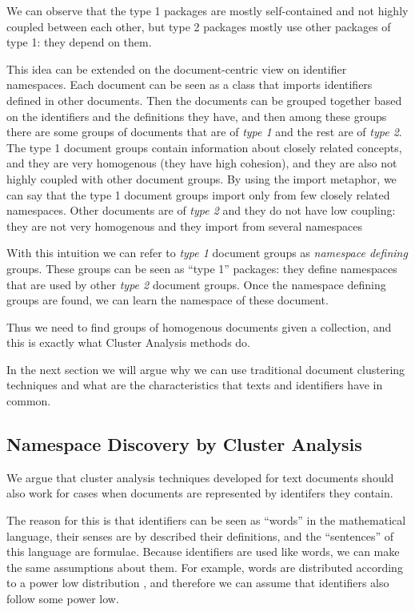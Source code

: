 We can observe that the type 1 packages are mostly self-contained
and not highly coupled between each other, but type 2 packages mostly
use other packages of type 1: they depend on them.

This idea can be extended on the document-centric view on
identifier namespaces. Each document can be seen as a class that
imports identifiers defined in other documents.
Then the documents can be grouped together based on the identifiers
and the definitions they have, and then among these groups
there are some groups of documents that are of \emph{type 1}
and the rest are of \emph{type 2}. The type 1 document groups
contain information about closely related concepts, and they are
very homogenous (they have high cohesion), and they are also
not highly coupled with other document groups.
By using the import metaphor, we can say that the type 1 document groups
import only from few closely related namespaces.
Other documents are of \emph{type 2} and they do not have
low coupling: they are not very homogenous and they import from several namespaces

With this intuition we can refer to \emph{type 1} document groups
as \emph{namespace defining} groups. These groups can be seen as ``type 1''
packages: they define namespaces that are used by other \emph{type 2}
document groups. Once the namespace defining groups are found,
we can learn the namespace of these document.

Thus we need to find groups of homogenous documents given a
collection, and this is exactly what Cluster Analysis methods do.

In the next section we will argue why we can use traditional
document clustering techniques and what are the characteristics
that texts and identifiers have in common.


\subsection{Namespace Discovery by Cluster Analysis} \label{sec:clusters-namespaces}

We argue that cluster analysis techniques developed for text documents
should also work for cases when documents are represented by
identifers they contain.

The reason for this is that identifiers can be seen as ``words'' in 
the mathematical language, their senses are by described their definitions,
and the ``sentences'' of this language are formulae. 
Because identifiers are used like words, we can make the same assumptions 
about them. For example, words are distributed according to a power low distribution
\cite{manning2008introduction}, and therefore we can assume that identifiers 
also follow some power low. 

